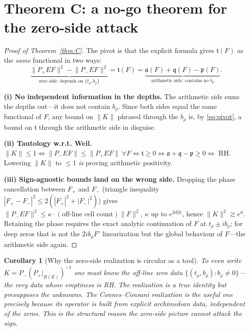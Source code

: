 \documentclass[11pt]{amsart}
\newtheorem{corollary}[theorem]{Corollary}
\theoremstyle{definition}
\theoremstyle{remark}
\newcommand{\tform}{\mathfrak t}
\newcommand{\rmar}{\mathfrak a}
\newcommand{\rmq}{\mathfrak q}
\newcommand{\rmp}{\mathfrak p}
\newcommand{\Kop}{K}
\newcommand{\Norm}[1]{\lVert #1 \rVert}
\begin{document}
\section{Theorem C: a no-go theorem for the zero-side attack}\label{sec:nogo}

\begin{proof}[Proof of Theorem~\ref{thm:C}]
The pivot is that the explicit formula gives $\tform(F)$ as the \emph{same} functional in
two ways:
\begin{equation}\label{eq:pivot}
\underbrace{\Norm{P_+EF}^{2}-\Norm{P_-EF}^{2}}_{\text{zero side: depends on }\{t_\rho,b_\rho\}}
=\tform(F)=
\underbrace{\rmar(F)+\rmq(F)-\rmp(F)}_{\text{arithmetic side: contains no }b_\rho}.
\end{equation}

\textbf{(i) No independent information in the depths.} The arithmetic side sums the
depths out---it does not contain $b_\rho$. Since both sides equal the same functional of
$F$, any bound on $\Norm{\Kop}$ phrased through the $b_\rho$ is, by \eqref{eq:pivot}, a
bound on $\tform$ through the arithmetic side in disguise.

\textbf{(ii) Tautology w.r.t. Weil.} $\Norm{\Kop}\le1\iff\Norm{P_-EF}\le\Norm{P_+EF}\
\forall F\iff\tform\ge0\iff\rmar+\rmq-\rmp\ge0\iff$ RH. Lowering $\Norm{\Kop}$ to $\le1$
\emph{is} proving arithmetic positivity.

\textbf{(iii) Sign-agnostic bounds land on the wrong side.} Dropping the phase
cancellation between $F_+$ and $F_-$ (triangle inequality
$|F_+-F_-|^{2}\le2(|F_+|^{2}+|F_-|^{2})$) gives
$\Norm{P_-EF}^{2}\le\kappa\cdot(\text{off-line cell count})\Norm{F}^{2}$, $\kappa$ up to
$e^{2d|b|}$, hence $\Norm{\Kop}^{2}\gtrsim e^{d}$. Retaining the phase requires the exact
analytic continuation of $F$ at $t_\rho\pm ib_\rho$; for deep zeros that is not the
$2ib_\rho F'$ linearization but the global behaviour of $F$---the arithmetic side again.
\end{proof}

\begin{corollary}[Why the zero-side realization is circular as a tool]\label{cor:circular}
To even write $\Kop=P_-(P_+|_{R(E)})^{-1}$ one must know the off-line zero data
$\{(t_\rho,b_\rho):b_\rho\ne0\}$---the very data whose emptiness is RH. The realization is
a true identity but presupposes the unknowns. The Connes--Consani realization is the
useful one precisely because its operator is built from explicit archimedean data,
independent of the zeros. This is the structural reason the zero-side picture cannot
attack the sign.
\end{corollary}
\end{document}

